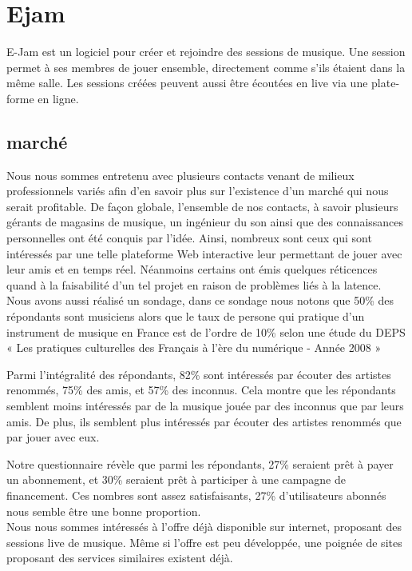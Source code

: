 \documentclass[a4,12pt]{article}
\begin{document}
\section{Ejam}

E-Jam est un logiciel pour créer et rejoindre des sessions de musique. Une session permet à ses membres de jouer ensemble, directement comme s’ils étaient dans la même salle. Les sessions créées peuvent aussi être écoutées en live via une plate-forme en ligne.

\subsection{marché}

Nous nous sommes entretenu avec plusieurs contacts venant de milieux professionnels variés afin d’en savoir plus sur l’existence d’un marché qui nous serait profitable. De façon globale, l’ensemble de nos contacts, à savoir plusieurs gérants de magasins de musique, un ingénieur du son ainsi que des connaissances personnelles ont été conquis par l’idée. Ainsi, nombreux sont ceux qui sont intéressés par une telle plateforme Web interactive leur permettant de jouer avec leur amis et en temps réel. Néanmoins certains ont émis quelques réticences quand à la faisabilité d'un tel projet en raison de problèmes liés à la latence.
\\


Nous avons aussi réalisé un sondage, dans ce sondage nous notons que 50\% des répondants sont musiciens alors que le taux de persone qui pratique d'un instrument de musique en France est de l'ordre de 10\% selon une étude du DEPS « Les pratiques culturelles des Français à l’ère du numérique - Année 2008 »

Parmi l’intégralité des répondants, 82\% sont intéressés par écouter des artistes renommés, 75\% des amis, et 57\% des inconnus. Cela montre que les répondants semblent moins intéressés par de la musique jouée par des inconnus que par leurs amis. De plus, ils semblent plus intéressés par écouter des artistes renommés que par jouer avec eux.

Notre questionnaire révèle que parmi les répondants, 27\% seraient prêt à payer un abonnement, et 30\% seraient prêt à participer à une campagne de financement. Ces nombres sont assez satisfaisants, 27\% d’utilisateurs abonnés nous semble être une bonne proportion.
\\


Nous nous sommes intéressés à l’offre déjà disponible sur internet, proposant des sessions live de musique. Même si l’offre est peu développée, une poignée de sites proposant des services similaires existent déjà.
\end{document}
